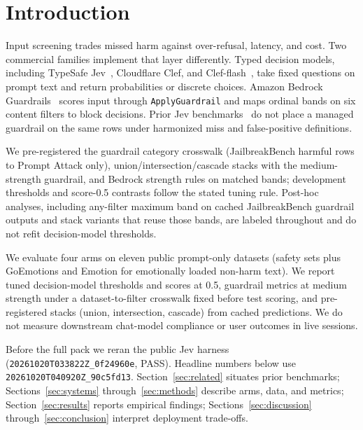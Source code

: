 \section{Introduction}

Input screening trades missed harm against over-refusal, latency, and cost.
Two commercial families implement that layer differently.
Typed decision models, including TypeSafe Jev~\cite{typesafe2026jevmodels,deusser2026jevbenchmark}, Cloudflare Clef, and Clef-flash~\cite{cloudflare2026clef,cloudflare2026clefflash}, take fixed questions on prompt text and return probabilities or discrete choices.
Amazon Bedrock Guardrails~\cite{aws2024bedrockguardrails} scores input through \texttt{ApplyGuardrail} and maps ordinal bands on six content filters to block decisions.
Prior Jev benchmarks~\cite{deusser2026jevbenchmark} do not place a managed guardrail on the same rows under harmonized miss and false-positive definitions.

We pre-registered the guardrail category crosswalk (JailbreakBench harmful rows to Prompt Attack only), union/intersection/cascade stacks with the medium-strength guardrail, and Bedrock strength rules on matched bands; development thresholds and score-0.5 contrasts follow the stated tuning rule.
Post-hoc analyses, including any-filter maximum band on cached JailbreakBench guardrail outputs and stack variants that reuse those bands, are labeled throughout and do not refit decision-model thresholds.

We evaluate four arms on eleven public prompt-only datasets (safety sets plus GoEmotions and Emotion for emotionally loaded non-harm text).
We report tuned decision-model thresholds and scores at 0.5, guardrail metrics at medium strength under a dataset-to-filter crosswalk fixed before test scoring, and pre-registered stacks (union, intersection, cascade) from cached predictions.
We do not measure downstream chat-model compliance or user outcomes in live sessions.

Before the full pack we reran the public Jev harness (\texttt{20261020T033822Z\_0f24960e}, PASS).
Headline numbers below use \texttt{20261020T040920Z\_90c5fd13}.
Section~\ref{sec:related} situates prior benchmarks; Sections~\ref{sec:systems} through~\ref{sec:methods} describe arms, data, and metrics; Section~\ref{sec:results} reports empirical findings; Sections~\ref{sec:discussion} through~\ref{sec:conclusion} interpret deployment trade-offs.
